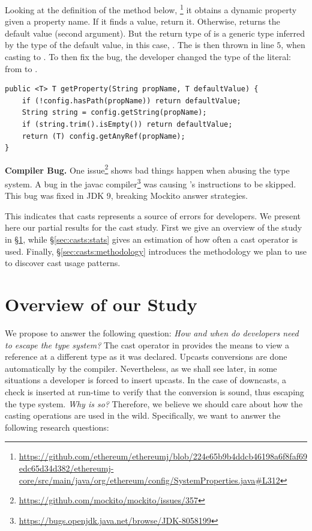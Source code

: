 Looking at the definition of the  method below,%
\footnote{\url{https://github.com/ethereum/ethereumj/blob/224e65b9b4ddcb46198a6f8faf69edc65d34d382/ethereumj-core/src/main/java/org/ethereum/config/SystemProperties.java\#L312}}
it obtains a dynamic property given a property name.
If it finds a value, return it.
Otherwise, returns the default value (second argument).
But the return type of  is a generic type inferred
by the type of the default value, in this case, .
The  is then thrown in line $5$,
when casting  to .
To then fix the bug, the developer changed the type of the literal:
from  to .

\begin{lstlisting}[style=java]
public <T> T getProperty(String propName, T defaultValue) {
    if (!config.hasPath(propName)) return defaultValue;
    String string = config.getString(propName);
    if (string.trim().isEmpty()) return defaultValue;
    return (T) config.getAnyRef(propName);
}
\end{lstlisting}

\textbf{Compiler Bug.}
One issue\footnote{\url{https://github.com/mockito/mockito/issues/357}} shows bad things happen when abusing the type system.
A bug in the \textsf{javac} compiler\footnote{\url{https://bugs.openjdk.java.net/browse/JDK-8058199}} was causing \jvm{}'s  instructions to be skipped.
This bug was fixed in JDK 9, breaking Mockito answer strategies.

This indicates that casts represents a source of errors for developers.
We present here our partial results for the cast study.
First we give an overview of the study in \S\ref{sec:casts:overview}, while \S\ref{sec:casts:stats} gives an estimation of how often a cast operator is used.
Finally, \S\ref{sec:casts:methodology} introduces the methodology we plan to use to discover cast usage patterns.

\section{Overview of our Study}
\label{sec:casts:overview}

We propose to answer the following question:
\emph{How and when do developers need to escape the type system?}
The cast operator in \java{} provides the means to view a reference at a different type as it was declared.
Upcasts conversions are done automatically by the compiler.
Nevertheless, as we shall see later, in some situations a developer is forced to insert upcasts.
In the case of downcasts, a check is inserted at run-time to verify that the conversion is sound, thus escaping the type system.
\emph{Why is so?}
Therefore, we believe we should care about how the casting operations are used in the wild.
Specifically, we want to answer the following research questions:

